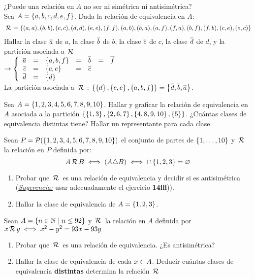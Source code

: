 \documentclass[12pt,a4paper, spanish]{article}
\begin{document}
¿Puede una relación en $A$ no ser ni simétrica ni antisimétrica? \\

\ejercicio
Sea $A = \set{a, b, c, d, e, f}$. Dada la relación de equivalencia en $A$:
\begin{align*}
	\relacion = \set{(a, a), (b, b), (c, c), (d, d), (e, e), (f, f), (a, b), (b, a), (a, f), (f, a), (b, f), (f, b), (c, e), (e, c)}
\end{align*}
Hallar la clase $\clase{a}$ de $a$, la clase $\clase{b}$ de $b$, la clase $\clase{c}$ de $c$, la clase $\clase{d}$ de $d$, y la partición asociada a $\relacion$ \\
\veinticuatro
$\to
	\llave{rclclcl}{
		\clase{a} & = & \set{a, b, f}  & = & \clase{b} & = & \clase{f} \\
		\clase{c} & = & \set{c, e}     & = & \clase{e} &   & \\
		\clase{d} & = & \set{d}        &   &         &   & \\
	}$ \\
La partición asociada a $\relacion:\,  \set{\set{d}, \set{c,e}, \set{a, b, f}} = \set{\clase{d}, \clase{b}, \clase{a}}$.

\ejercicio
\Hacer
Sea $A = \set{1,2,3,4,5,6,7,8,9,10}$. Hallar y graficar la relación de equivalencia en $A$ asociada a la partición $\set{ \set{1,3}, \set{2,6,7}, \set{4,8,9,10}, \set{5} }$.
¿Cuántas clases de equivalencia distintas tiene? Hallar un representante para cada clase.

\ejercicio
\Hacer
Sean $P = \partes(\set{1,2,3,4,5,6,7,8,9,10})$ el conjunto de partes de $\set{1,\dots, 10}$ y $\relacion$ la relación en $P$ definida por:
\[
	A \relacion B \sisolosi (A \triangle B) \sisolosi \inter \set{1,2,3} = \vacio
\]
\begin{enumerate}[label=\roman*)]
	\item  Probar que $\relacion$ es una relación de equivalencia y decidir si es antisimétrica (\textit{\underline{Sugerencia:}} usar adecuadamente el ejercicio \textbf{14iii})).
	\item Hallar la clase de equivalencia de $A = \set{1,2,3}$.
\end{enumerate}

\separadorCorto

\ejercicio
Sean $A = \set{n \en \naturales \talque n \leq 92}$ y
$\relacion$ la relación en $A$ definida por
$x \relacion y \sisolosi x^2 - y^2 = 93x - 93y$
\begin{enumerate}[label=\roman*)]
	\item Probar que $\relacion$ es una relación de equivalencia. ¿Es antisimétrica?
	\item Hallar la clase de equivalencia de cada $x \en A$. Deducir cuántas clases de equivalencia \textbf{distintas} determina la relación $\relacion$
\end{enumerate}
\end{document}
